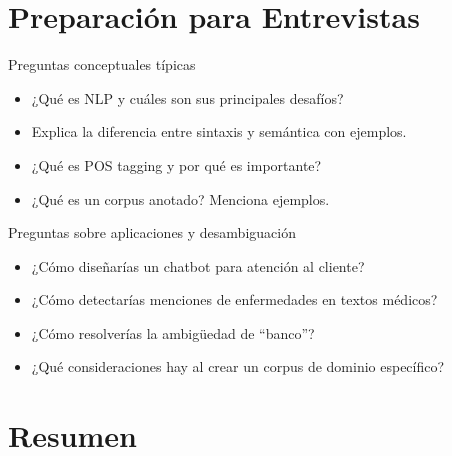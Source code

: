 \documentclass[aspectratio=169, 10pt, xcolor=table]{beamer}
\begin{document}
\section{Preparación para Entrevistas}

\begin{frame}{Preguntas conceptuales típicas}
    \begin{itemize}
        \item ¿Qué es NLP y cuáles son sus principales desafíos?
        \item Explica la diferencia entre sintaxis y semántica con ejemplos.
        \item ¿Qué es POS tagging y por qué es importante?
        \item ¿Qué es un corpus anotado? Menciona ejemplos.
    \end{itemize}
\end{frame}

\begin{frame}{Preguntas sobre aplicaciones y desambiguación}
    \begin{itemize}
        \item ¿Cómo diseñarías un chatbot para atención al cliente?
        \item ¿Cómo detectarías menciones de enfermedades en textos médicos?
        \item ¿Cómo resolverías la ambigüedad de ``banco''?
        \item ¿Qué consideraciones hay al crear un corpus de dominio específico?
    \end{itemize}
\end{frame}

\section{Resumen}
\end{document}
